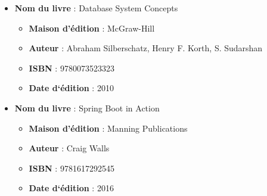 \begin{sloppypar}
\begin{itemize}
    \item \textbf{Nom du livre} : Database System Concepts
    \begin{itemize}
        \item [•] \textbf{Maison d’édition} : McGraw-Hill
        \item [•] \textbf{Auteur} : Abraham Silberschatz, Henry F. Korth, S. Sudarshan
        \item [•] \textbf{ISBN} : 9780073523323
        \item [•] \textbf{Date d‘édition} : 2010
    \end{itemize}

    \item \textbf{Nom du livre} : Spring Boot in Action
    \begin{itemize}
        \item [•] \textbf{Maison d’édition} : Manning Publications
        \item [•] \textbf{Auteur} : Craig Walls
        \item [•] \textbf{ISBN} : 9781617292545
        \item [•] \textbf{Date d‘édition} : 2016
    \end{itemize}
\end{itemize}
\end{sloppypar}